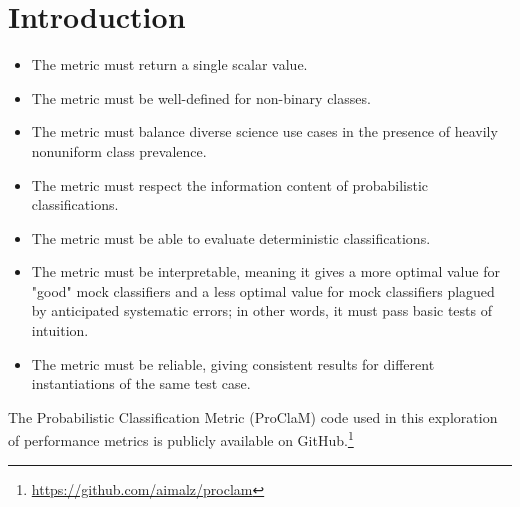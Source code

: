 \section{Introduction}
\label{sec:intro}



\begin{itemize}
\item    The metric must return a single scalar value.
\item    The metric must be well-defined for non-binary classes.
\item    The metric must balance diverse science use cases in the presence of heavily nonuniform class prevalence.
\item    The metric must respect the information content of probabilistic classifications.
\item    The metric must be able to evaluate deterministic classifications.
\item    The metric must be interpretable, meaning it gives a more optimal value for "good" mock classifiers and a less optimal value for mock classifiers plagued by anticipated systematic errors; in other words, it must pass basic tests of intuition.
\item    The metric must be reliable, giving consistent results for different instantiations of the same test case.
\end{itemize}

The Probabilistic Classification Metric (ProClaM) code used in this exploration of performance metrics is publicly available on GitHub.\footnote{\url{https://github.com/aimalz/proclam}}
